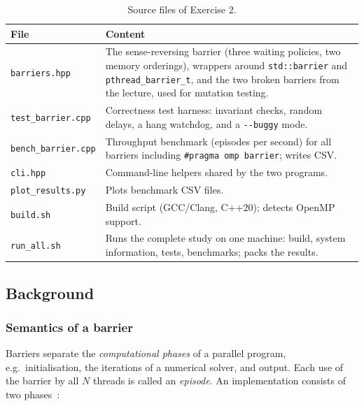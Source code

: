 \begin{table}[H]
\centering
\caption{Source files of Exercise 2.}
\label{tab:ex2-files}
\begin{tabular}{l p{11.6cm}}
\toprule
\textbf{File} & \textbf{Content} \\
\midrule
\texttt{barriers.hpp}       & The sense-reversing barrier (three waiting policies, two
                              memory orderings), wrappers around \texttt{std::barrier}
                              and \texttt{pthread\_barrier\_t}, and the two broken
                              barriers from the lecture, used for mutation testing. \\
\texttt{test\_barrier.cpp}  & Correctness test harness: invariant checks, random
                              delays, a hang watchdog, and a \texttt{-{}-buggy} mode. \\
\texttt{bench\_barrier.cpp} & Throughput benchmark (episodes per second) for all
                              barriers including \texttt{\#pragma omp barrier};
                              writes CSV. \\
\texttt{cli.hpp}            & Command-line helpers shared by the two programs. \\
\texttt{plot\_results.py}   & Plots benchmark CSV files. \\
\texttt{build.sh}           & Build script (GCC/Clang, C++20); detects OpenMP support. \\
\texttt{run\_all.sh}        & Runs the complete study on one machine: build, system
                              information, tests, benchmarks; packs the results. \\
\bottomrule
\end{tabular}
\end{table}

\subsection{Background}
\label{sec:ex2-background}

\subsubsection{Semantics of a barrier}

Barriers separate the \emph{computational phases} of a parallel program,
e.g.\ initialisation, the iterations of a numerical solver, and output. Each
use of the barrier by all $N$ threads is called an \emph{episode}. An
implementation consists of two phases~\cite{lecture04,scott2013}:

